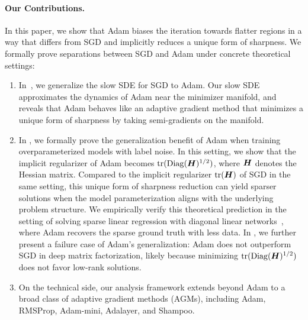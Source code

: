 \paragraph{Our Contributions.} In this paper, we show that Adam biases the iteration towards flatter regions in a way that differs from SGD and implicitly reduces a unique form of sharpness. We formally prove separations between SGD and Adam under concrete theoretical settings:
\begin{enumerate}
    \item In~, we generalize the slow SDE for SGD to Adam. Our slow SDE approximates the dynamics of Adam near the minimizer manifold, and reveals that Adam behaves like an adaptive gradient method that minimizes a unique form of sharpness by taking semi-gradients on the manifold.
    \item In , we formally prove the generalization benefit of Adam when training overparameterized models with label noise. In this setting, we show that the implicit regularizer of Adam becomes $\text{tr}(\mathrm{Diag}({\bm{H}})^{1/2})$, where ${\bm{H}}$ denotes the Hessian matrix. Compared to the implicit regularizer $\text{tr}({\bm{H}})$ of SGD in the same setting, this unique form of sharpness reduction can yield sparser solutions when the model parameterization aligns with the underlying problem structure. 
    We empirically verify this theoretical prediction in the setting of solving sparse linear regression with diagonal linear networks~\citep{woodworth2020kernel}, 
    where Adam recovers the sparse ground truth with less data. 
    In , we further present a failure case of Adam's generalization: Adam does not outperform SGD in deep matrix factorization, likely because minimizing $\text{tr}(\mathrm{Diag}({\bm{H}})^{1/2})$ does not favor low-rank solutions.
    \item On the technical side, our analysis framework extends beyond Adam to a broad class of adaptive gradient methods (AGMs), including Adam, RMSProp, Adam-mini, Adalayer, and Shampoo.

\end{enumerate}

